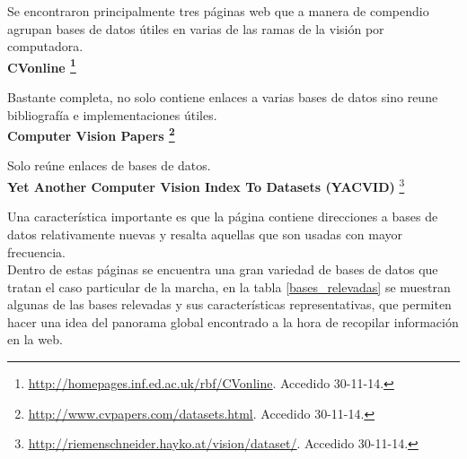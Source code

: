 Se encontraron principalmente tres páginas web que a manera de compendio agrupan  bases de datos útiles en varias de las ramas de la visión por computadora.\\

\hspace{-0.7cm} \textbf{CVonline \footnote{\textcolor{blue}{\underline{\url{http://homepages.inf.ed.ac.uk/rbf/CVonline}}}. Accedido 30-11-14.} } 

Bastante completa, no solo contiene enlaces a  varias bases de datos sino reune bibliografía e implementaciones útiles.\\


\hspace{-0.7cm} \textbf{Computer Vision Papers \footnote{\textcolor{blue}{\underline{\url{ http://www.cvpapers.com/datasets.html}}}. Accedido 30-11-14.} } 

	 Solo reúne enlaces de bases de datos.\\
		

\hspace{-0.7cm} \textbf{Yet Another Computer Vision Index To Datasets (YACVID)} \footnote{\textcolor{blue}{\underline{\url{http://riemenschneider.hayko.at/vision/dataset/}}}. Accedido 30-11-14. } 	

Una característica importante es que la página contiene direcciones a bases de datos relativamente nuevas y resalta aquellas que son usadas con mayor frecuencia. \\
	

Dentro de estas páginas se encuentra una gran variedad de bases de datos que tratan el caso particular de la marcha, en la tabla \ref{bases_relevadas} se muestran algunas de las bases relevadas y sus características representativas, que permiten hacer una idea del panorama global encontrado a la hora de recopilar información en la web.  

